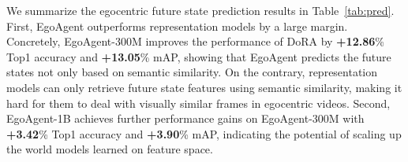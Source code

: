 \begin{table}[tbp]
  \centering
  \caption{Feature retrieval results on predicted features of the next frame and features extracted from the next frame. Averaged Top-1 accuracy and mAP on total timesteps $T_{s}=4$ are reported.}
    \vspace{-0.5em}
  \label{tab:pred}%
\end{table}%

\vspace{1.5mm}
 We summarize the egocentric future state prediction results in Table~\ref{tab:pred}. First, 
EgoAgent outperforms representation models by a large margin. Concretely, EgoAgent-300M improves the performance of DoRA by \textbf{+12.86}\% Top1 accuracy and \textbf{+13.05}\% mAP, showing that EgoAgent predicts the future states not only based on semantic similarity. On the contrary, representation models can only retrieve future state features using semantic similarity, making it hard for them to deal with visually similar frames in egocentric videos. Second, EgoAgent-1B achieves further performance gains on EgoAgent-300M with \textbf{+3.42}\% Top1 accuracy and \textbf{+3.90}\% mAP, indicating the potential of scaling up the world models learned on feature space. 

